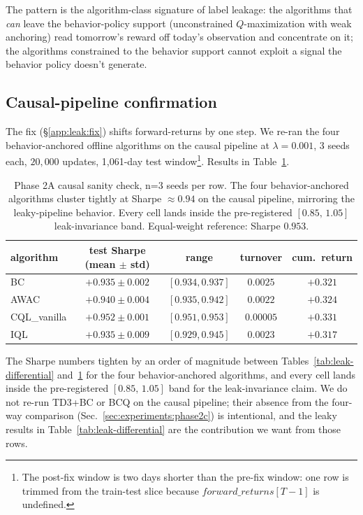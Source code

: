 The pattern is the algorithm-class signature of label leakage: the
algorithms that \emph{can} leave the behavior-policy support
(unconstrained $Q$-maximization with weak anchoring) read tomorrow's
reward off today's observation and concentrate on it; the algorithms
constrained to the behavior support cannot exploit a signal the
behavior policy doesn't generate.

\subsection{Causal-pipeline confirmation}
\label{app:leak:causal}

The fix (\S\ref{app:leak:fix}) shifts forward-returns by one step. We
re-ran the four behavior-anchored offline algorithms on the causal
pipeline at $\lambda = 0.001$, 3 seeds each, $20{,}000$ updates,
1{,}061-day test window\footnote{The post-fix window is two days shorter
than the pre-fix window: one row is trimmed from the train-test slice
because $\mathit{forward\_returns}[T-1]$ is undefined.}. Results in
Table~\ref{tab:causal-confirmation}.

\begin{table}[t]
\centering
\caption{Phase 2A causal sanity check, n=3 seeds per row. The four
behavior-anchored algorithms cluster tightly at Sharpe $\approx 0.94$
on the causal pipeline, mirroring the leaky-pipeline behavior. Every
cell lands inside the pre-registered $[0.85,\,1.05]$ leak-invariance
band. Equal-weight reference: Sharpe $0.953$.}
\label{tab:causal-confirmation}
\small
\begin{tabular}{lcccc}
\toprule
algorithm  & test Sharpe (mean $\pm$ std) & range & turnover & cum.\ return \\
\midrule
BC          & $+0.935 \pm 0.002$ & $[0.934, 0.937]$ & $0.0025$  & $+0.321$ \\
AWAC        & $+0.940 \pm 0.004$ & $[0.935, 0.942]$ & $0.0022$  & $+0.324$ \\
CQL\_vanilla & $+0.952 \pm 0.001$ & $[0.951, 0.953]$ & $0.00005$ & $+0.331$ \\
IQL         & $+0.935 \pm 0.009$ & $[0.929, 0.945]$ & $0.0023$  & $+0.317$ \\
\bottomrule
\end{tabular}
\end{table}

The Sharpe numbers tighten by an order of magnitude between
Tables~\ref{tab:leak-differential} and~\ref{tab:causal-confirmation}
for the four behavior-anchored algorithms, and every cell lands
inside the pre-registered $[0.85,\,1.05]$ band for the leak-invariance
claim. We do not re-run TD3+BC or BCQ on the causal pipeline; their
absence from the four-way comparison
(Sec.~\ref{sec:experiments:phase2c}) is intentional, and the leaky
results in Table~\ref{tab:leak-differential} are the contribution we
want from those rows.

